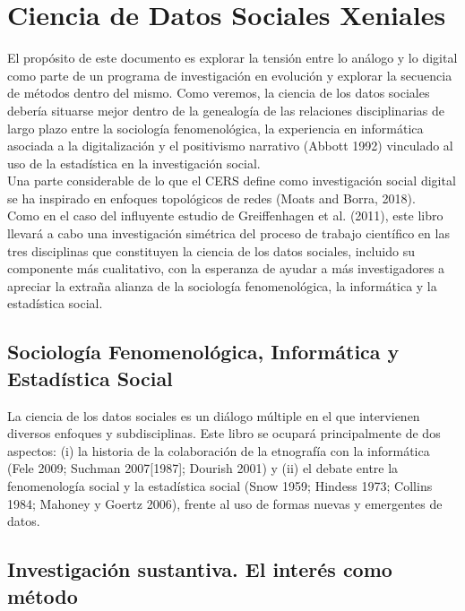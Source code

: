 
\section{Ciencia de Datos Sociales Xeniales}
El propósito de este documento es explorar la tensión entre lo análogo y lo digital como parte de un programa de investigación en evolución y explorar la secuencia de métodos dentro del mismo. Como veremos, la ciencia de los datos sociales debería situarse mejor dentro de la genealogía de las relaciones disciplinarias de largo plazo entre la sociología fenomenológica, la experiencia en informática asociada a la digitalización y el positivismo narrativo (Abbott 1992) vinculado al uso de la estadística en la investigación social.\\

Una parte considerable de lo que el CERS define como investigación social digital se ha inspirado en enfoques topológicos de redes (Moats and Borra, 2018).\\

Como en el caso del influyente estudio de Greiffenhagen et al. (2011), este libro llevará a cabo una investigación simétrica del proceso de trabajo científico en las tres disciplinas que constituyen la ciencia de los datos sociales, incluido su componente más cualitativo, con la esperanza de ayudar a más investigadores a apreciar la extraña alianza de la sociología fenomenológica, la informática y la estadística social.\\

\subsection{Sociología Fenomenológica, Informática y Estadística Social}
La ciencia de los datos sociales es un diálogo múltiple en el que intervienen diversos enfoques y subdisciplinas. Este libro se ocupará principalmente de dos aspectos: (i) la historia de la colaboración de la etnografía con la informática (Fele 2009; Suchman 2007[1987]; Dourish 2001) y (ii) el debate entre la fenomenología social y la estadística social (Snow 1959; Hindess 1973; Collins 1984; Mahoney y Goertz 2006), frente al uso de formas nuevas y emergentes de datos.

\subsection{Investigación sustantiva. El interés como método}

